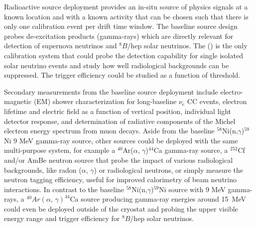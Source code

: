 


Radioactive source deployment provides an in-situ source of physics signals at a known location and with a known activity that can be chosen such that there is only one calibration event per drift time window. The baseline source design probes de-excitation products (gamma-rays) which are directly relevant for detection of supernova neutrinos and $^{8}B$/hep solar neutrinos. The  () is the only calibration system that could probe the detection capability for single isolated solar neutrino events and study how well radiological backgrounds can be suppressed. The trigger efficiency could be studied %
as a function of threshold. 

Secondary measurements from the baseline source deployment include electro-magnetic (EM) shower characterization for long-baseline $\nu_e$ CC events, electron lifetime and electric field as a function of  vertical position, individual light detector response, and determination of radiative components of the Michel electron energy spectrum from muon decays. Aside from the baseline $^{58}$Ni(n,$\gamma$)$^{59}$Ni 9 MeV gamma-ray source, other sources could be deployed with the same multi-purpose system, for example a $^{40}$Ar($\alpha,\,\gamma$)$^{44}$Ca gamma-ray source, a $^{252}$Cf and/or AmBe neutron source that probe the impact of various radiological backgrounds, like radon ($\alpha,\,\gamma$) or radiological neutrons, or simply measure the neutron tagging efficiency, useful for improved calorimetry of beam neutrino interactions. In contrast to the baseline $^{58}$Ni(n,$\gamma$)$^{59}$Ni source with 9 MeV gamma-rays, a $^{40}Ar(\alpha,\,\gamma)^{44}$Ca source producing gamma-ray energies around 15~MeV could even be deployed outside of the cryostat and probing the upper visible energy range and trigger efficiency for $^{8}B$/hep solar neutrinos. 

